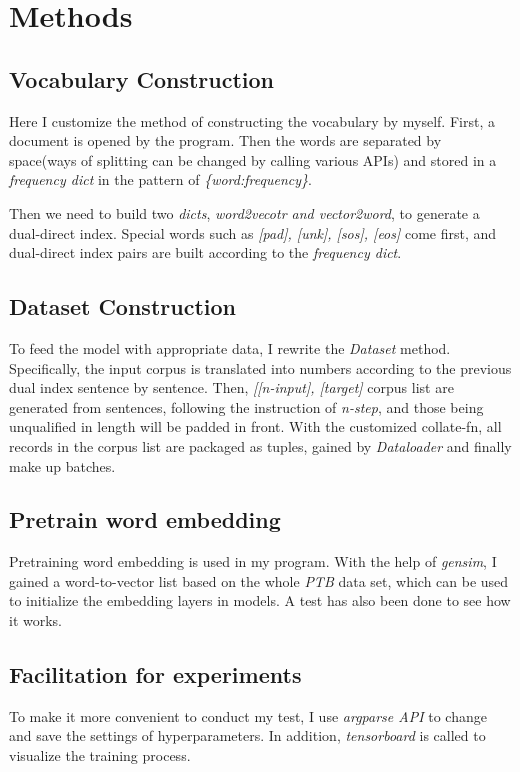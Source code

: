 \documentclass[11pt,a4paper]{article}
\begin{document}
\section{Methods}

\subsection{Vocabulary Construction}
Here I customize the method of constructing the vocabulary by myself. 
First, a document is opened by the program. Then the words are separated by space(ways of splitting can be changed by calling various APIs) and stored in a \emph{frequency dict} in the pattern of \emph{\{word:frequency\}}.

Then we need to build two \emph{dicts}, \emph{word2vecotr and vector2word}, to generate a dual-direct index. Special words such as \emph{[pad], [unk], [sos], [eos]} come first, and dual-direct index pairs are built according to the \emph{frequency dict}.

\subsection{Dataset Construction}
To feed the model with appropriate data, I rewrite the \emph{Dataset} method.
Specifically, the input corpus is translated into numbers according to the previous dual index sentence by sentence.
Then, \emph{[[n-input], [target]} corpus list are generated from sentences, following the instruction of \emph{n-step}, and those being unqualified in length will be padded in front. 
With the customized collate-fn, all records in the corpus list are packaged as tuples, gained by \emph{Dataloader} and finally make up batches. 

\subsection{Pretrain word embedding}
Pretraining word embedding \citep{mikolov2013efficient} is used in my program. With the help of \emph{gensim}, I gained a word-to-vector list based on the whole \emph{PTB} data set, which can be used to initialize the embedding layers in models. A test has also been done to see how it works.

\subsection{Facilitation for experiments}
To make it more convenient to conduct my test, I use \emph{argparse API} to change and save the settings of hyperparameters. In addition, \emph{tensorboard} is called to visualize the training process. 
\end{document}
